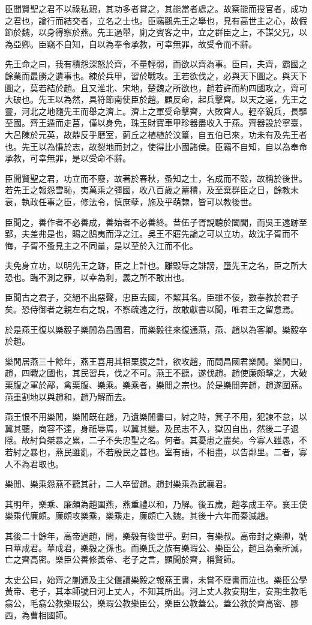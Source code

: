 臣聞賢聖之君不以祿私親，其功多者賞之，其能當者處之。故察能而授官者，成功之君也，論行而結交者，立名之士也。臣竊觀先王之舉也，見有高世主之心，故假節於魏，以身得察於燕。先王過舉，廁之賓客之中，立之群臣之上，不謀父兄，以為亞卿。臣竊不自知，自以為奉令承教，可幸無罪，故受令而不辭。

先王命之曰，我有積怨深怒於齊，不量輕弱，而欲以齊為事。臣曰，夫齊，霸國之餘業而最勝之遺事也。練於兵甲，習於戰攻。王若欲伐之，必與天下圖之。與天下圖之，莫若結於趙。且又淮北、宋地，楚魏之所欲也，趙若許而約四國攻之，齊可大破也。先王以為然，具符節南使臣於趙。顧反命，起兵擊齊。以天之道，先王之靈，河北之地隨先王而舉之濟上。濟上之軍受命擊齊，大敗齊人。輕卒銳兵，長驅至國。齊王遁而走莒，僅以身免，珠玉財寶車甲珍器盡收入于燕。齊器設於寧臺，大呂陳於元英，故鼎反乎磿室，薊丘之植植於汶篁，自五伯已來，功未有及先王者也。先王以為慊於志，故裂地而封之，使得比小國諸侯。臣竊不自知，自以為奉命承教，可幸無罪，是以受命不辭。

臣聞賢聖之君，功立而不廢，故著於春秋，蚤知之士，名成而不毀，故稱於後世。若先王之報怨雪恥，夷萬乘之彊國，收八百歲之蓄積，及至棄群臣之日，餘教未衰，執政任事之臣，修法令，慎庶孽，施及乎萌隸，皆可以教後世。

臣聞之，善作者不必善成，善始者不必善終。昔伍子胥說聽於闔閭，而吳王遠跡至郢，夫差弗是也，賜之鴟夷而浮之江。吳王不寤先論之可以立功，故沈子胥而不悔，子胥不蚤見主之不同量，是以至於入江而不化。

夫免身立功，以明先王之跡，臣之上計也。離毀辱之誹謗，墮先王之名，臣之所大恐也。臨不測之罪，以幸為利，義之所不敢出也。

臣聞古之君子，交絕不出惡聲，忠臣去國，不絜其名。臣雖不佞，數奉教於君子矣。恐侍御者之親左右之說，不察疏遠之行，故敢獻書以聞，唯君王之留意焉。

於是燕王復以樂毅子樂閒為昌國君，而樂毅往來復通燕，燕、趙以為客卿。樂毅卒於趙。

樂閒居燕三十餘年，燕王喜用其相栗腹之計，欲攻趙，而問昌國君樂閒。樂閒曰，趙，四戰之國也，其民習兵，伐之不可。燕王不聽，遂伐趙。趙使廉頗擊之，大破栗腹之軍於鄗，禽栗腹、樂乘。樂乘者，樂閒之宗也。於是樂閒奔趙，趙遂圍燕。燕重割地以與趙和，趙乃解而去。

燕王恨不用樂閒，樂閒既在趙，乃遺樂閒書曰，紂之時，箕子不用，犯諫不怠，以冀其聽，商容不達，身祇辱焉，以冀其變。及民志不入，獄囚自出，然後二子退隱。故紂負桀暴之累，二子不失忠聖之名。何者。其憂患之盡矣。今寡人雖愚，不若紂之暴也，燕民雖亂，不若殷民之甚也。室有語，不相盡，以告鄰里。二者，寡人不為君取也。

樂閒、樂乘怨燕不聽其計，二人卒留趙。趙封樂乘為武襄君。

其明年，樂乘、廉頗為趙圍燕，燕重禮以和，乃解。後五歲，趙孝成王卒。襄王使樂乘代廉頗。廉頗攻樂乘，樂乘走，廉頗亡入魏。其後十六年而秦滅趙。

其後二十餘年，高帝過趙，問，樂毅有後世乎。對曰，有樂叔。高帝封之樂卿，號曰華成君。華成君，樂毅之孫也。而樂氏之族有樂瑕公、樂臣公，趙且為秦所滅，亡之齊高密。樂臣公善修黃帝、老子之言，顯聞於齊，稱賢師。

太史公曰，始齊之蒯通及主父偃讀樂毅之報燕王書，未嘗不廢書而泣也。樂臣公學黃帝、老子，其本師號曰河上丈人，不知其所出。河上丈人教安期生，安期生教毛翕公，毛翕公教樂瑕公，樂瑕公教樂臣公，樂臣公教蓋公。蓋公教於齊高密、膠西，為曹相國師。